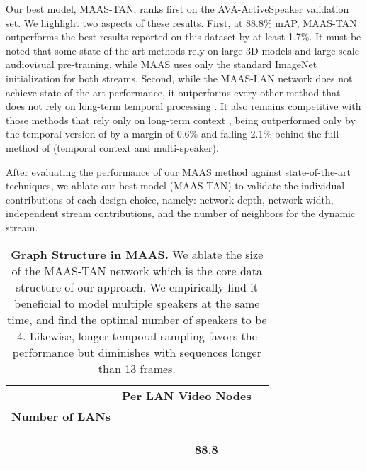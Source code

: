 \documentclass[10pt,twocolumn,letterpaper]{article}
\begin{document}
Our best model, MAAS-TAN, ranks first on the AVA-ActiveSpeaker validation set. We highlight two aspects of these results. First, at 88.8\% mAP, MAAS-TAN outperforms the best results reported on this dataset by at least 1.7\%. It must be noted that some state-of-the-art methods \cite{chung2019naver, zhangmulti} rely on large 3D models and large-scale audiovisual pre-training, while MAAS uses only the standard ImageNet initialization for both streams. Second, while the MAAS-LAN network does not achieve state-of-the-art performance, it outperforms every other method that does not rely on long-term temporal processing \cite{roth2019ava, zhangmulti}. It also remains competitive with those methods that rely only on long-term context \cite{chung2019naver, alcazar2020active}, being outperformed only by the temporal version of \cite{alcazar2020active} by a margin of 0.6\% and falling 2.1\% behind the full method of \cite{alcazar2020active} (temporal context and multi-speaker). 


After evaluating the performance of our MAAS method against state-of-the-art techniques, we ablate our best model  (MAAS-TAN) to validate the individual contributions of each design choice, namely: network depth, network width, independent stream contributions, and the number of neighbors for the dynamic stream.
\begin{table}[t]
    \small
    \centering
    \begin{tabular}{c c c c c c c} 
    \toprule
    \multicolumn{1}{c}{} & \multicolumn{5}{c}{ \textbf{Per LAN Video Nodes}} \\
    \multicolumn{1}{c}{\textbf{Number of LANs}} &  &  &  &  & \\ 
    \midrule
              &  &  &  &  &    \\
              &  &  &  &  &   \\ 
              &  &  &  &  &      \\ 
             &  &  &  & \textbf{88.8} &       \\  
             &  &  &  &  &       \\ 
    \toprule
    \end{tabular}
    \caption{\textbf{ Graph Structure in MAAS.} We ablate the size of the MAAS-TAN network which is the core data structure of our approach. We empirically find it beneficial to model multiple speakers at the same time, and find the optimal number of speakers to be 4. Likewise, longer temporal sampling favors the performance but diminishes with sequences longer than 13 frames. }
    \label{tab:context_size}
\end{table}
 
\end{document}
